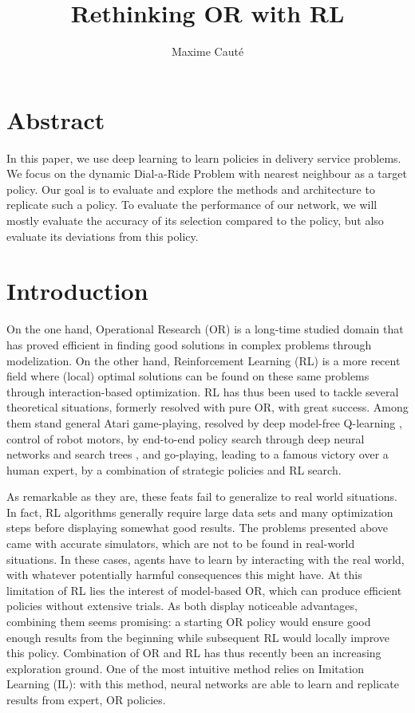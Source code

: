 \documentclass{article}
\title{Rethinking OR with RL}
\author{Maxime Cauté}
\begin{document}
\maketitle

\section*{Abstract}

In this paper, we use deep learning to learn policies in delivery service problems. 
We focus on the dynamic Dial-a-Ride Problem with nearest neighbour as a target policy.
Our goal is to evaluate and explore the methods and architecture to replicate such a policy.
To evaluate the performance of our network, we will mostly evaluate the accuracy of its selection compared to the policy, 
but also evaluate its deviations from this policy.

\section{Introduction}

On the one hand, Operational Research (OR) is a long-time studied domain that has proved efficient in finding good solutions in complex problems through modelization. 
On the other hand, Reinforcement Learning (RL) is a more recent field where (local) optimal solutions can be found on these same problems through interaction-based optimization.
RL has thus been used to tackle several theoretical situations, formerly resolved with pure OR, with great success.
Among them stand general Atari game-playing, resolved by deep model-free Q-learning \cite{Minh2015}, %
control of robot motors, by end-to-end policy search through deep neural networks and search trees \cite{Levine2016}, %
and go-playing, leading to a famous victory over a human expert, by a combination of strategic policies and RL search. \cite{Silver2016} %

As remarkable as they are, these feats fail to generalize to real world situations. %
In fact, RL algorithms generally require large data sets and many optimization steps before displaying somewhat good results.
The problems presented above came with accurate simulators, which are not to be found in real-world situations.
In these cases, agents have to learn by interacting with the real world, with whatever potentially harmful consequences this might have.
At this limitation of RL lies the interest of model-based OR, which can produce efficient policies without extensive trials.
As both display noticeable advantages, combining them seems promising: %
a starting OR policy would ensure good enough results from the beginning while subsequent RL would locally improve this policy.
Combination of OR and RL has thus recently been an increasing exploration ground.
One of the most intuitive method relies on Imitation Learning (IL):
with this method, neural networks are able to learn and replicate results from expert, OR policies.
\end{document}
